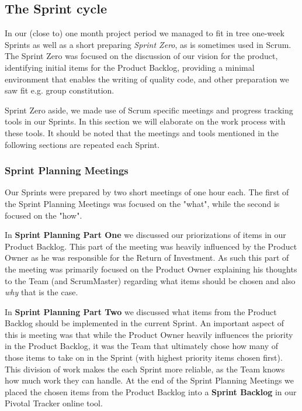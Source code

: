 \subsection{The Sprint cycle}

In our (close to) one month project period we managed to fit in tree one-week Sprints as well as a short preparing \textit{Sprint Zero}, as is sometimes used in Scrum. The Sprint Zero was focused on the discussion of our vision for the product, identifying initial items for the Product Backlog, providing a minimal environment that enables the  writing of quality code, and other preparation we saw fit e.g. group constitution.

Sprint Zero aside, we made use of Scrum specific meetings and progress tracking tools in our Sprints. In this section we will elaborate on the work process with these tools. It should be noted that the meetings and tools mentioned in the following sections are repeated each Sprint.


\subsubsection{Sprint Planning Meetings} 
Our Sprints were prepared by two short meetings of one hour each. The first of the Sprint Planning Meetings was focused on the "what", while the second is focused on the "how".

In \textbf{Sprint Planning Part One}  we discussed our priorizations of items in our Product Backlog. This part of the meeting was heavily influenced by the Product Owner as he was responsible for the Return of Investment. As such this part of the meeting was primarily focused on the Product Owner explaining his thoughts to the Team (and ScrumMaster) regarding what items should be chosen and also \textit{why} that is the case.

In \textbf{Sprint Planning Part Two} we discussed what items from the Product Backlog should be implemented in the current Sprint. An important aspect of this is meeting was that while the Product Owner heavily influences the priority in the Product Backlog, it was the Team that ultimately chose how many of those items to take on in the Sprint (with highest priority items chosen first). This division of work makes the each Sprint more reliable, as the Team knows how much work they can handle. At the end of the Sprint Planning Meetings we placed the chosen items from the Product Backlog into a \textbf{Sprint Backlog} in our Pivotal Tracker online tool. 

